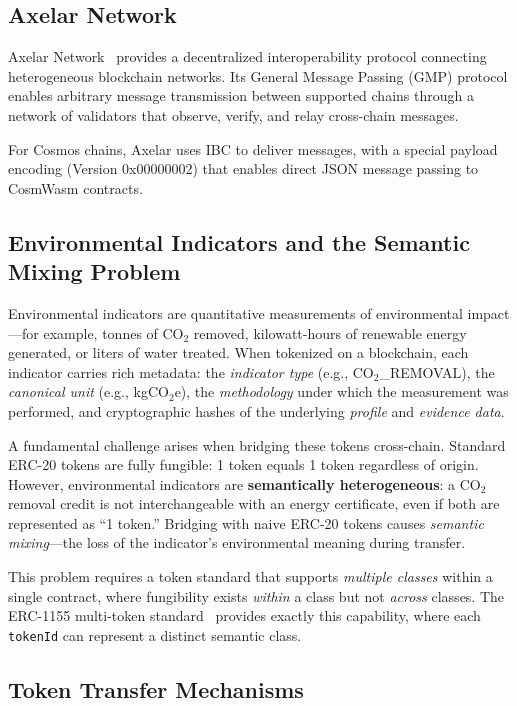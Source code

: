 \documentclass[conference,10pt]{IEEEtran}
\begin{document}
\subsection{Axelar Network}

Axelar Network~\cite{axelar2024} provides a decentralized interoperability protocol connecting heterogeneous blockchain networks. Its General Message Passing (GMP) protocol enables arbitrary message transmission between supported chains through a network of validators that observe, verify, and relay cross-chain messages.

For Cosmos chains, Axelar uses IBC to deliver messages, with a special payload encoding (Version 0x00000002) that enables direct JSON message passing to CosmWasm contracts.

\subsection{Environmental Indicators and the Semantic Mixing Problem}
\label{sec:indicators}

Environmental indicators are quantitative measurements of environmental impact---for example, tonnes of CO$_2$ removed, kilowatt-hours of renewable energy generated, or liters of water treated. When tokenized on a blockchain, each indicator carries rich metadata: the \textit{indicator type} (e.g., CO$_2$\_REMOVAL), the \textit{canonical unit} (e.g., kgCO$_2$e), the \textit{methodology} under which the measurement was performed, and cryptographic hashes of the underlying \textit{profile} and \textit{evidence data}.

A fundamental challenge arises when bridging these tokens cross-chain. Standard ERC-20 tokens are fully fungible: 1 token equals 1 token regardless of origin. However, environmental indicators are \textbf{semantically heterogeneous}: a CO$_2$ removal credit is not interchangeable with an energy certificate, even if both are represented as ``1 token.'' Bridging with naive ERC-20 tokens causes \textit{semantic mixing}---the loss of the indicator's environmental meaning during transfer.

This problem requires a token standard that supports \textit{multiple classes} within a single contract, where fungibility exists \textit{within} a class but not \textit{across} classes. The ERC-1155 multi-token standard~\cite{erc1155} provides exactly this capability, where each \texttt{tokenId} can represent a distinct semantic class.

\subsection{Token Transfer Mechanisms}
\end{document}
